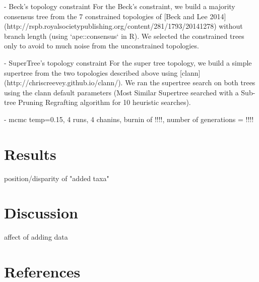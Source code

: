 \documentclass[a4paper,11pt]{article}
\begin{document}
 - Beck's topology constraint
For the Beck's constraint, we build a majority consensus tree from the 7 constrained topologies of [Beck and Lee 2014]\\ (http://rspb.royalsocietypublishing.org/content/281/1793/20141278) without branch length (using `ape::consensus` in R).
We selected the constrained trees only to avoid to much noise from the unconstrained topologies.

 - SuperTree's topology constraint
For the super tree topology, we build a simple supertree from the two topologies described above using [clann](http://chriscreevey.github.io/clann/).
We ran the supertree search on both trees using the clann default parameters (Most Similar Supertree searched with a Sub-tree Pruning Regrafting algorithm for 10 heuristic searches).

 - mcmc temp=0.15, 4 runs, 4 chanins, burnin of !!!!, number of generations = !!!! 

\section{Results} 

position/disparity of "added taxa"

\section{Discussion}

affect of adding data


 










 

\section{References}



\end{document}
